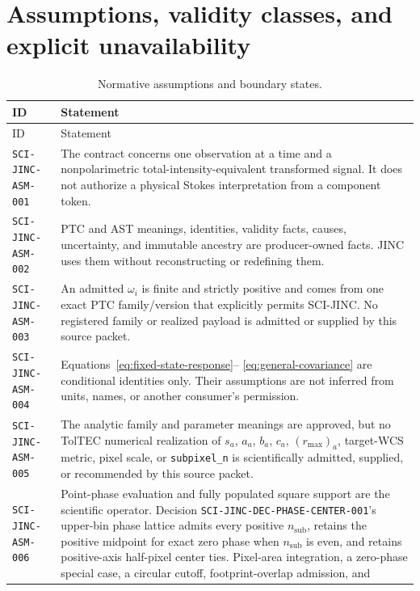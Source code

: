 \section{Assumptions, validity classes, and explicit unavailability}
\label{sec:assumptions}

\begin{longtable}{@{}>{\raggedright\arraybackslash}p{}
                        >{\raggedright\arraybackslash}p{}@{}}
\caption{Normative assumptions and boundary states.}\label{tab:assumptions}\\
\toprule
ID & Statement \\
\midrule
\endfirsthead
\toprule
ID & Statement \\
\midrule
\endhead
\texttt{SCI-JINC-ASM-001} & The contract concerns one observation at a time
and a nonpolarimetric total-intensity-equivalent transformed signal.  It does
not authorize a physical Stokes interpretation from a component token. \\
\texttt{SCI-JINC-ASM-002} & PTC and AST meanings, identities, validity facts,
causes, uncertainty, and immutable ancestry are producer-owned facts.  JINC
uses them without reconstructing or redefining them. \\
\texttt{SCI-JINC-ASM-003} & An admitted $\omega_i$ is finite and strictly
positive and comes from one exact PTC family/version that explicitly permits
SCI-JINC.  No registered family or realized payload is admitted or supplied by
this source packet. \\
\texttt{SCI-JINC-ASM-004} & Equations~\eqref{eq:fixed-state-response}--
\eqref{eq:general-covariance} are conditional identities only.  Their
assumptions are not inferred from units, names, or another consumer's
permission. \\
\texttt{SCI-JINC-ASM-005} & The analytic family and parameter meanings are
approved, but no TolTEC numerical realization of $s_a$, $a_a$, $b_a$, $c_a$,
$(r_{\max})_a$, target-WCS metric, pixel scale, or
\texttt{subpixel\_n} is scientifically admitted, supplied, or recommended by
this source packet. \\
\texttt{SCI-JINC-ASM-006} & Point-phase evaluation and fully populated square
support are the scientific operator.  Decision
\texttt{SCI-JINC-DEC-PHASE-CENTER-001}'s upper-bin phase
lattice admits every positive $n_{\mathrm{sub}}$, retains the positive
midpoint for exact zero phase when $n_{\mathrm{sub}}$ is even, and retains
positive-axis half-pixel center ties.  Pixel-area integration, a zero-phase
special case, a circular cutoff, footprint-overlap admission, and

\end{longtable}
